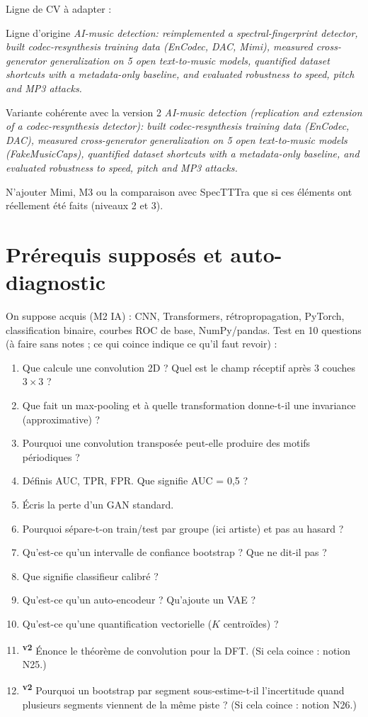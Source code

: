 \documentclass[11pt,a4paper]{article}
\providecommand{\og}{\guillemotleft\nobreakspace}%
\providecommand{\fg}{\nobreakspace\guillemotright}}
\newcommand{\vtwo}{\textsuperscript{\textcolor{orange!80!black}{\textbf{v2}}}}
\begin{document}
Ligne de CV à adapter :

\begin{info}{Ligne d'origine}
\textit{AI-music detection: reimplemented a spectral-fingerprint detector, built codec-resynthesis training data (EnCodec, DAC, Mimi), measured cross-generator generalization on 5 open text-to-music models, quantified dataset shortcuts with a metadata-only baseline, and evaluated robustness to speed, pitch and MP3 attacks.}
\end{info}

\begin{corr}{Variante cohérente avec la version 2}
\textit{AI-music detection (replication and extension of a codec-resynthesis detector): built codec-resynthesis training data (EnCodec, DAC), measured cross-generator generalization on 5 open text-to-music models (FakeMusicCaps), quantified dataset shortcuts with a metadata-only baseline, and evaluated robustness to speed, pitch and MP3 attacks.}

N'ajouter Mimi, M3 ou la comparaison avec SpecTTTra que si ces éléments ont réellement été faits (niveaux 2 et 3).
\end{corr}
\section{Prérequis supposés et auto-diagnostic}\label{sec:prereq}

On suppose acquis (M2 IA) : CNN, Transformers, rétropropagation, PyTorch, classification binaire, courbes ROC de base, NumPy/pandas. Test en 10 questions (à faire sans notes ; ce qui coince indique ce qu'il faut revoir) :

\begin{enumerate}
\item Que calcule une convolution 2D ? Quel est le champ réceptif après 3 couches $3\times3$ ?
\item Que fait un max-pooling et à quelle transformation donne-t-il une invariance (approximative) ?
\item Pourquoi une convolution transposée peut-elle produire des motifs périodiques ?
\item Définis AUC, TPR, FPR. Que signifie \og{}AUC = 0,5\fg{} ?
\item Écris la perte d'un GAN standard.
\item Pourquoi sépare-t-on train/test \og{}par groupe\fg{} (ici artiste) et pas au hasard ?
\item Qu'est-ce qu'un intervalle de confiance bootstrap ? Que ne dit-il pas ?
\item Que signifie \og{}classifieur calibré\fg{} ?
\item Qu'est-ce qu'un auto-encodeur ? Qu'ajoute un VAE ?
\item Qu'est-ce qu'une quantification vectorielle ($K$ centroïdes) ?
\item \vtwo{} Énonce le théorème de convolution pour la DFT. (Si cela coince : notion N25.)
\item \vtwo{} Pourquoi un bootstrap par segment sous-estime-t-il l'incertitude quand plusieurs segments viennent de la même piste ? (Si cela coince : notion N26.)
\end{enumerate}
\end{document}
